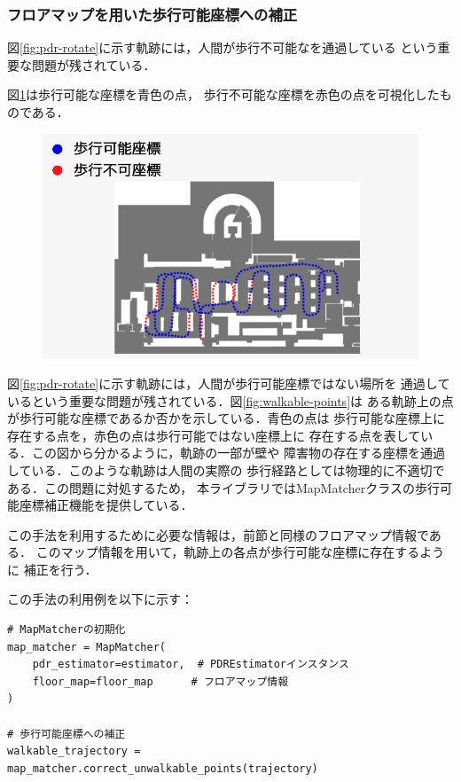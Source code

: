 
\subsubsection{フロアマップを用いた歩行可能座標への補正}

図\ref{fig:pdr-rotate}に示す軌跡には，人間が歩行不可能なを通過している
という重要な問題が残されている．

図\ref{fig:unwalkable_points}は歩行可能な座標を青色の点，
歩行不可能な座標を赤色の点を可視化したものである．
\begin{figure}[H]
    \centering
    \includegraphics[width=\linewidth]{image/unwalkable_points.jpg}
    \caption{}    \label{fig:unwalkable_points}
\end{figure}


図\ref{fig:pdr-rotate}に示す軌跡には，人間が歩行可能座標ではない場所を
通過しているという重要な問題が残されている．図\ref{fig:walkable-points}は
ある軌跡上の点が歩行可能な座標であるか否かを示している．青色の点は
歩行可能な座標上に存在する点を，赤色の点は歩行可能ではない座標上に
存在する点を表している．この図から分かるように，軌跡の一部が壁や
障害物の存在する座標を通過している．このような軌跡は人間の実際の
歩行経路としては物理的に不適切である．この問題に対処するため，
本ライブラリではMapMatcherクラスの歩行可能座標補正機能を提供している．


この手法を利用するために必要な情報は，前節と同様のフロアマップ情報である．
このマップ情報を用いて，軌跡上の各点が歩行可能な座標に存在するように
補正を行う．

この手法の利用例を以下に示す：

\begin{lstlisting}
# MapMatcherの初期化
map_matcher = MapMatcher(
    pdr_estimator=estimator,  # PDREstimatorインスタンス
    floor_map=floor_map      # フロアマップ情報
)

# 歩行可能座標への補正
walkable_trajectory = map_matcher.correct_unwalkable_points(trajectory)
\end{lstlisting}

